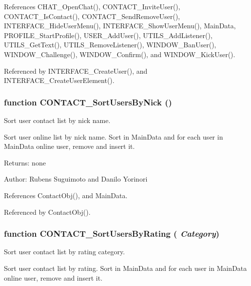 References CHAT\_\-OpenChat(), CONTACT\_\-InviteUser(), CONTACT\_\-IsContact(), CONTACT\_\-SendRemoveUser(), INTERFACE\_\-HideUserMenu(), INTERFACE\_\-ShowUserMenu(), MainData, PROFILE\_\-StartProfile(), USER\_\-AddUser(), UTILS\_\-AddListener(), UTILS\_\-GetText(), UTILS\_\-RemoveListener(), WINDOW\_\-BanUser(), WINDOW\_\-Challenge(), WINDOW\_\-Confirm(), and WINDOW\_\-KickUser().

Referenced by INTERFACE\_\-CreateUser(), and INTERFACE\_\-CreateUserElement().
\subsubsection[CONTACT\_\-SortUsersByNick]{\setlength{\rightskip}{0pt plus 5cm}function CONTACT\_\-SortUsersByNick ()}\label{contact_2contact_8js_34963449ceb0259a67715775cbfb7a29}


Sort user contact list by nick name. 

Sort user online list by nick name. Sort in MainData and for each user in MainData online user, remove and insert it.

\begin{Desc}
\item[Returns:]none \end{Desc}
\begin{Desc}
\item[Author:]Rubens Suguimoto and Danilo Yorinori \end{Desc}


References ContactObj(), and MainData.

Referenced by ContactObj().
\subsubsection[CONTACT\_\-SortUsersByRating]{\setlength{\rightskip}{0pt plus 5cm}function CONTACT\_\-SortUsersByRating ( {\em Category})}\label{contact_2contact_8js_f855d90db2e8ebda598e0afedcf80966}


Sort user contact list by rating category. 

Sort user contact list by rating. Sort in MainData and for each user in MainData online user, remove and insert it.

